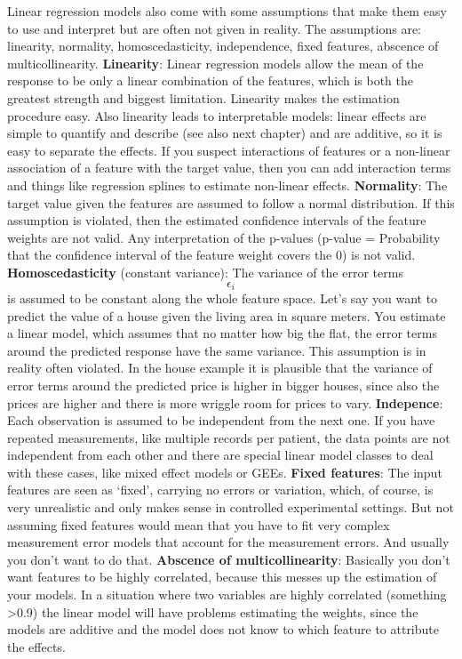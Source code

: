 \documentclass[12pt,]{krantz}
\theoremstyle{definition}
\theoremstyle{definition}
\theoremstyle{definition}
\theoremstyle{remark}
\begin{document}
Linear regression models also come with some assumptions that make them
easy to use and interpret but are often not given in reality. The
assumptions are: linearity, normality, homoscedasticity, independence,
fixed features, abscence of multicollinearity. \textbf{Linearity}:
Linear regression models allow the mean of the response to be only a
linear combination of the features, which is both the greatest strength
and biggest limitation. Linearity makes the estimation procedure easy.
Also linearity leads to interpretable models: linear effects are simple
to quantify and describe (see also next chapter) and are additive, so it
is easy to separate the effects. If you suspect interactions of features
or a non-linear association of a feature with the target value, then you
can add interaction terms and things like regression splines to estimate
non-linear effects. \textbf{Normality}: The target value given the
features are assumed to follow a normal distribution. If this assumption
is violated, then the estimated confidence intervals of the feature
weights are not valid. Any interpretation of the p-values (p-value =
Probability that the confidence interval of the feature weight covers
the 0) is not valid. \textbf{Homoscedasticity} (constant variance): The
variance of the error terms \[\epsilon_{i}\] is assumed to be constant
along the whole feature space. Let's say you want to predict the value
of a house given the living area in square meters. You estimate a linear
model, which assumes that no matter how big the flat, the error terms
around the predicted response have the same variance. This assumption is
in reality often violated. In the house example it is plausible that the
variance of error terms around the predicted price is higher in bigger
houses, since also the prices are higher and there is more wriggle room
for prices to vary. \textbf{Indepence}: Each observation is assumed to
be independent from the next one. If you have repeated measurements,
like multiple records per patient, the data points are not independent
from each other and there are special linear model classes to deal with
these cases, like mixed effect models or GEEs. \textbf{Fixed features}:
The input features are seen as `fixed', carrying no errors or variation,
which, of course, is very unrealistic and only makes sense in controlled
experimental settings. But not assuming fixed features would mean that
you have to fit very complex measurement error models that account for
the measurement errors. And usually you don't want to do that.
\textbf{Abscence of multicollinearity}: Basically you don't want
features to be highly correlated, because this messes up the estimation
of your models. In a situation where two variables are highly correlated
(something \textgreater{}0.9) the linear model will have problems
estimating the weights, since the models are additive and the model does
not know to which feature to attribute the effects.
\end{document}
